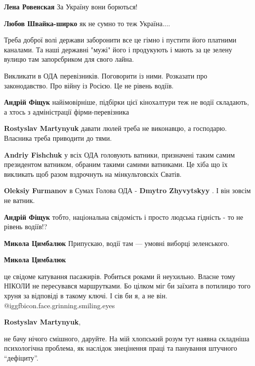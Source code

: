 \begin{itemize}
\begin{itemize}
\textbf{Лена Ровенская} За Україну вони борються!

\textbf{Любов Швайка-ширко} як не сумно то теж Україна....


\end{itemize} %


Треба доброї волі держави заборонити все це гімно і пустити його платними
каналами. Та наші державні "мужі" його і продукують і мають за це зелену вулицю
там запорєбриком для свого лайна.


Викликати в ОДА перевізників. Поговорити із ними. Розказати про законодавство.
Про війну із Росією. Це не рівень водіїв.

\begin{itemize} %
\textbf{Андрій Фіщук} найімовірніше, підбірки цієї кінохалтури теж не водії складають, а хтось з адміністрації фірми-перевізника

\textbf{Rostyslav Martynyuk} давати люлей треба не виконавцю, а господарю. Власника треба приводити до тями.

\textbf{Andriy Fishchuk} у всіх ОДА головують ватники, призначені таким самим президентом ватником, обраним такими самими ватниками. Це хіба що їх викликать щоб разом вздрочнуть на мінкультовскіх Сватів.

\textbf{Oleksiy Furmanov} в Сумах Голова ОДА - \textbf{Dmytro Zhyvytskyy} . І він зовсім не ватник.

\textbf{Андрій Фіщук} тобто, національна свідомість і просто людська гідність - то не рівень водіїв!?

\textbf{Микола Цимбалюк} Припускаю, водії там — умовні виборці зеленського.

\textbf{Микола Цимбалюк} 

це свідоме катування пасажирів. Робиться роками й неухильно. Власне тому НІКОЛИ
не пересувався маршрутками. Бо цілком міг би заїхита в потилицю того хруня за
відповіді в такому ключі. І сів би я, а не він.
@igg{fbicon.face.grinning.smiling.eyes} 

\textbf{Rostyslav Martynyuk}, 

не бачу нічого смішного, даруйте. На мій хлопський розум тут наявна складніша
психологічна проблема, як наслідок знецінення праці та панування штучного
\enquote{дефіциту}.


\end{itemize}
\end{itemize}

